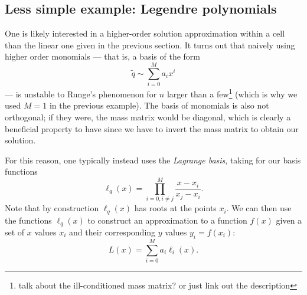 \documentclass[12pt]{article}
\numberwithin{equation}{section}
\begin{document}
\subsection{Less simple example: Legendre polynomials}

One is likely interested in a higher-order solution approximation within a cell than the linear one given in the previous section.
It turns out that naively using higher order monomials --- that is, a basis of the form 
\begin{equation}
\tilde{q} \sim \sum_{i=0}^M a_i x^i
\end{equation}
--- is unstable to Runge's phenomenon for $n$ larger than a few\footnote{talk about the ill-conditioned mass matrix? or just link out the description} (which is why we used $M=1$ in the previous example).
The basis of monomials is also not orthogonal; if they were, the mass matrix would be diagonal, which is clearly a beneficial property to have since we have to invert the mass matrix to obtain our solution.

For this reason, one typically instead uses the \textit{Lagrange basis}, taking for our basis functions
\begin{equation}
\ell_{q}(x) = \prod_{i=0, i \neq j}^{M} \frac{x - x_i}{x_j - x_i}.
\end{equation}
Note that by construction $\ell_q(x)$ has roots at the points $x_i$.
We can then use the functions $\ell_{q}(x)$ to construct an approximation to a function $f(x)$ given a set of $x$ values $x_i$ and their corresponding $y$ values $y_i = f(x_i)$:
\begin{equation}
L(x) = \sum_{i=0}^{M} a_i \ell_i(x).
\end{equation}
\end{document}
